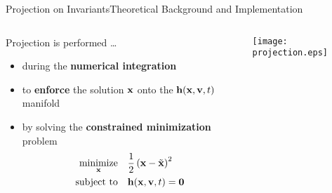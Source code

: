 \begin{frame}{Projection on Invariants}{Theoretical Background and Implementation}
  \vspace{-1.0em}
  \begin{columns}
    \begin{column}[c]{0.6\textwidth}
      Projection is performed \dots
      \begin{itemize}
        \item during the \textbf{numerical integration}
        \item to \textbf{enforce} the solution $\mathbf{x}$ onto the $\mathbf{h}(\mathbf{x}, \mathbf{v}, t)$ manifold
        \item by solving the \textbf{constrained minimization} problem
          \begin{align*}
            \underset{\mathbf{x}}{\text{minimize}} \quad &\dfrac{1}{2}\left(\mathbf{x} - \tilde{\mathbf{x}}\right)^2 \\
            \text{subject to} \quad &\mathbf{h}(\mathbf{x}, \mathbf{v}, t) = \mathbf{0}
          \end{align*}
        \end{itemize}
      \end{column}
      \begin{column}[c]{0.4\textwidth}
        \hspace{-0.2\textwidth}\texttt{[image: projection.eps]}
      \end{column}
    \end{columns}
    \vspace{1.0em}
\end{frame}


